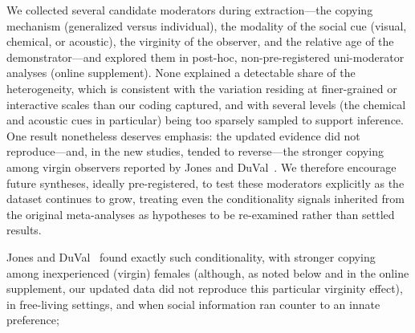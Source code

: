 %
We collected several candidate moderators during extraction---the copying
mechanism (generalized versus individual), the modality of the social cue
(visual, chemical, or acoustic), the virginity of the observer, and the relative
age of the demonstrator---and explored them in post-hoc, non-pre-registered
uni-moderator analyses (online supplement). None explained a detectable share of
the heterogeneity, which is consistent with the variation residing at
finer-grained or interactive scales than our coding captured, and with several
levels (the chemical and acoustic cues in particular) being too sparsely sampled
to support inference. One result nonetheless deserves emphasis: the updated
evidence did not reproduce---and, in the new studies, tended to reverse---the
stronger copying among virgin observers reported by Jones and
DuVal~\cite{jonesMechanismsSocialInfluence2019}. We therefore encourage future
syntheses, ideally pre-registered, to test these moderators explicitly as the
dataset continues to grow, treating even the conditionality signals inherited
from the original meta-analyses as hypotheses to be re-examined rather than
settled results.


Jones and DuVal~\cite{jonesMechanismsSocialInfluence2019} found exactly such
conditionality, with stronger copying among inexperienced (virgin) females
(although, as noted below and in the online supplement, our updated data did not
reproduce this particular virginity effect), in free-living settings, and when
social information ran counter to an innate preference;


